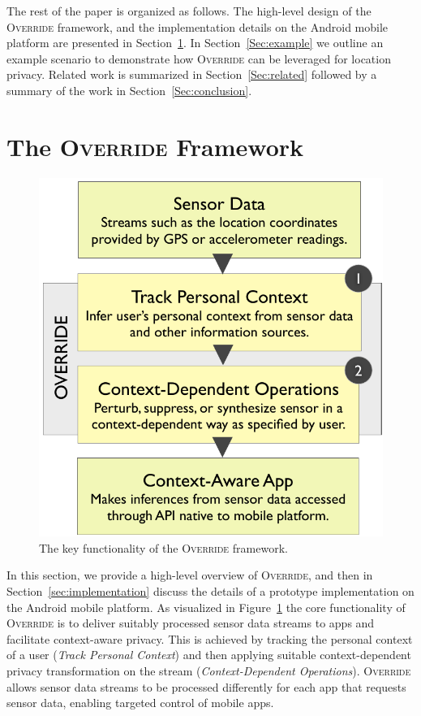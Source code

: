 \documentclass[10pt]{sensys-proc}
\begin{document}
The rest of the paper is organized as follows. The high-level design of the \textsc{Override} framework, and the implementation details on the Android mobile platform are presented in Section~\ref{Sec:architecture}. In Section~\ref{Sec:example} we outline an example scenario to demonstrate how \textsc{Override} can be leveraged for location privacy. Related work is summarized in Section~\ref{Sec:related} followed by a summary of the work in Section~\ref{Sec:conclusion}.

\section{The \textsc{Override} Framework}
\label{Sec:architecture}
\begin{figure}
\includegraphics[width=\columnwidth]{../figures/flow5.pdf}
\caption{The key functionality of the \textsc{Override} framework.}
\label{fig:flow}
\end{figure}

In this section, we provide a high-level overview of \textsc{Override}, and then in Section~\ref{sec:implementation} discuss the details of a prototype implementation on the Android mobile platform. As visualized in Figure~\ref{fig:flow} the core functionality of \textsc{Override} is to deliver suitably processed sensor data streams to apps and facilitate context-aware privacy. This is achieved by tracking the personal context of a user (\emph{Track Personal Context}) and then applying suitable context-dependent privacy transformation on the stream (\emph{Context-Dependent Operations}). \textsc{Override} allows sensor data streams to be processed differently for each app that requests sensor data, enabling targeted control of mobile apps.
\end{document}
